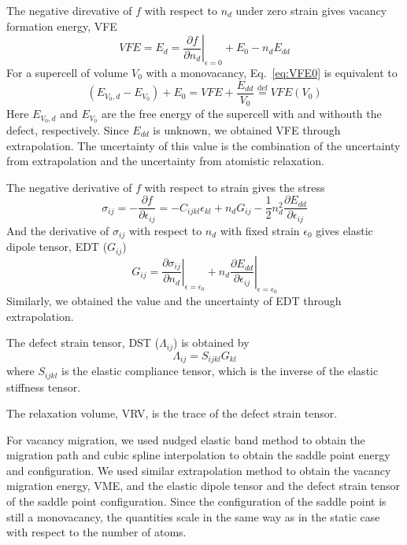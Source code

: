 \documentclass[%
 reprint,
 amsmath,amssymb,
 aps,
]{revtex4-1}
\begin{document}
The negative direvative of $f$ with respect to $n_d$ under zero strain gives vacancy formation energy, VFE
\begin{equation}
  \label{eq:VFE0}
  \mathit{VFE} = E_d = \left.\frac{\partial f}{\partial n_d}\right|_{\epsilon = 0} + E_{0} - n_d E_{dd}
\end{equation}
For a supercell of volume $V_0$ with a monovacancy, Eq.~\ref{eq:VFE0} is equivalent to
\begin{equation}
  (E_{V_0, d} - E_{V_0}) + E_{0} = \mathit{VFE} + \frac{E_{dd}}{V_0} \stackrel{\mathrm{def}}{=} \mathit{VFE}(V_0)
\end{equation}
Here $E_{V_0, d}$ and $E_{V_0}$ are the free energy of the supercell with and withouth the defect, respectively.
Since $E_{dd}$ is unknown, we obtained VFE through extrapolation.
The uncertainty of this value is the combination of the uncertainty from extrapolation and the uncertainty from atomistic relaxation.

The negative derivative of $f$ with respect to strain gives the stress
\begin{equation}
  \label{eq:stress}
  \sigma_{ij} = -\frac{\partial f}{\partial \epsilon_{ij}}
  = -C_{ijkl}\epsilon_{kl} + n_dG_{ij} - \frac{1}{2}n_d^2\frac{\partial E_{dd}}{\partial \epsilon_{ij}}
\end{equation}
And the derivative of $\sigma_{ij}$ with respect to $n_d$ with fixed strain $\epsilon_0$ gives elastic dipole tensor, EDT ($G_{ij}$)
\begin{equation}
  \label{eq:EDT}
  G_{ij} = \left.\frac{\partial \sigma_{ij}}{\partial n_d}\right|_{\epsilon = \epsilon_0}
  + n_d \left.\frac{\partial E_{dd}}{\partial \epsilon_{ij}}\right|_{\epsilon = \epsilon_0}
\end{equation}
Similarly, we obtained the value and the uncertainty of EDT through extrapolation.

The defect strain tensor, DST ($\Lambda_{ij}$) is obtained by
\begin{equation}
  \label{eq:DST}
  \Lambda_{ij} = S_{ijkl} G_{kl}
\end{equation}
where $S_{ijkl}$ is the elastic compliance tensor, which is the inverse of the elastic stiffness tensor.

The relaxation volume, VRV, is the trace of the defect strain tensor.

For vacancy migration, we used nudged elastic band method to obtain the migration path and cubic spline interpolation to obtain the saddle point energy and configuration.
We used similar extrapolation method to obtain the vacancy migration energy, VME, and the elastic dipole tensor and the defect strain tensor of the saddle point configuration.
Since the configuration of the saddle point is still a monovacancy, the quantities scale in the same way as in the static case with respect to the number of atoms.
\end{document}
